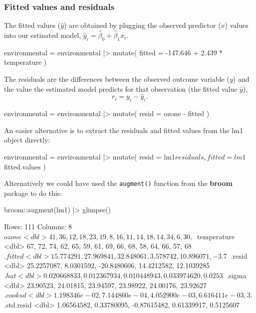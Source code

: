 \documentclass[a4paper]{article}
\begin{document}
\subsubsection{Fitted values and residuals}
The fitted values (\( \hat{y} \)) are obtained by plugging the observed predictor (\( x \)) values into our estinated model, \( \hat{y}_i =\hat{\beta}_0 + \hat{\beta}_1 x_i \).
\begin{Schunk}
\begin{Sinput}
environmental = environmental |> 
  mutate(
    fitted = -147.646 + 2.439 * temperature
  )
\end{Sinput}
\end{Schunk}
The residuals are the differences between the observed outcome variable (\( y \)) and the value the estimated model predicts for that observation (the fitted value \( \hat{y} \)),
\[
	r_i = y_i - \hat{y}_i.
\]
\begin{Schunk}
\begin{Sinput}
environmental = environmental |> 
  mutate(
    resid = ozone - fitted
    )
\end{Sinput}
\end{Schunk}
An easier alternative is to extract the residuals and fitted values from the lm1 object directly:
\begin{Schunk}
\begin{Sinput}
environmental = environmental |> 
  mutate(
    resid = lm1$residuals,
    fitted = lm1$fitted.values
  )
\end{Sinput}
\end{Schunk}
Alternatively we could have used the \lstinline|augment()| function from the \textbf{broom} package to do this:
\begin{Schunk}
\begin{Sinput}
broom::augment(lm1) |> glimpse()
\end{Sinput}
\begin{Soutput}
Rows: 111
Columns: 8
$ ozone       <dbl> 41, 36, 12, 18, 23, 19, 8, 16, 11, 14, 18, 14, 34, 6, 30, ~
$ temperature <dbl> 67, 72, 74, 62, 65, 59, 61, 69, 66, 68, 58, 64, 66, 57, 68~
$ .fitted     <dbl> 15.774291, 27.969841, 32.848061, 3.578742, 10.896071, -3.7~
$ .resid      <dbl> 25.2257087, 8.0301592, -20.8480606, 14.4212582, 12.1039285~
$ .hat        <dbl> 0.020668833, 0.012367934, 0.010448943, 0.033974620, 0.0253~
$ .sigma      <dbl> 23.90523, 24.01815, 23.94597, 23.98922, 24.00176, 23.92627~
$ .cooksd     <dbl> 1.198346e-02, 7.144860e-04, 4.052900e-03, 6.616411e-03, 3.~
$ .std.resid  <dbl> 1.06564582, 0.33780095, -0.87615482, 0.61339917, 0.5125607~
\end{Soutput}
\end{Schunk}
\end{document}
